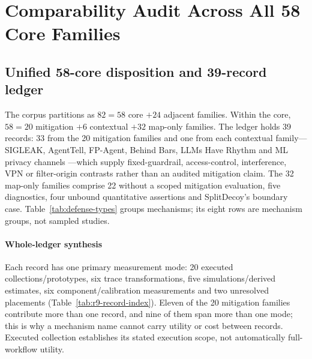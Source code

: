 \section{Comparability Audit Across All 58 Core Families}\label{sec:defenses}
\subsection{Unified 58-core disposition and 39-record ledger}
The corpus partitions as $82=58$ core $+24$ adjacent families. Within the core, $58=20$ mitigation $+6$ contextual $+32$ map-only families. The ledger holds 39 records: 33 from the 20 mitigation families and one from each contextual family---SIGLEAK, AgentTell, FP-Agent, Behind Bars, LLMs Have Rhythm and ML privacy channels \cite{geng2026sigleak,shahriar2026agenttell,wang2026fpagent,gu2026behindbars,alhazbi2025rhythm,debenedetti2024privacy}---which supply fixed-guardrail, access-control, interference, VPN or filter-origin contrasts rather than an audited mitigation claim. The 32 map-only families comprise 22 without a scoped mitigation evaluation, five diagnostics, four unbound quantitative assertions and SplitDecoy's boundary case. Table~\ref{tab:defense-types} groups mechanisms; its eight rows are mechanism groups, not sampled studies.

\paragraph{Whole-ledger synthesis}
Each record has one primary measurement mode: 20 executed collections/prototypes, six trace transformations, five simulations/derived estimates, six component/calibration measurements and two unresolved placements (Table~\ref{tab:r9-record-index}). Eleven of the 20 mitigation families contribute more than one record, and nine of them span more than one mode; this is why a mechanism name cannot carry utility or cost between records. Executed collection establishes its stated execution scope, not automatically full-workflow utility.

